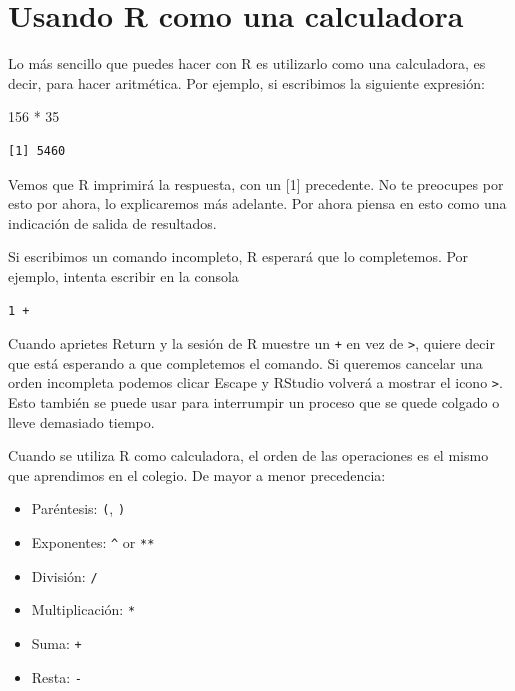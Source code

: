 \documentclass[
  letterpaper,
  DIV=11,
  numbers=noendperiod]{scrreprt}
\newenvironment{Shaded}{\begin{snugshade}}{\end{snugshade}}
\newcommand{\DecValTok}[1]{\textcolor[rgb]{0.68,0.00,0.00}{#1}}
\newcommand{\SpecialCharTok}[1]{\textcolor[rgb]{0.37,0.37,0.37}{#1}}
\providecommand{\tightlist}{%
  \setlength{\itemsep}{0pt}\setlength{\parskip}{0pt}}\usepackage{longtable,booktabs,array}
\begin{document}
\hypertarget{usando-r-como-una-calculadora}{%
\section{Usando R como una
calculadora}\label{usando-r-como-una-calculadora}}

Lo más sencillo que puedes hacer con R es utilizarlo como una
calculadora, es decir, para hacer aritmética. Por ejemplo, si escribimos
la siguiente expresión:

\begin{Shaded}
\begin{Highlighting}[]
\DecValTok{156} \SpecialCharTok{*} \DecValTok{35}
\end{Highlighting}
\end{Shaded}

\begin{verbatim}
[1] 5460
\end{verbatim}

Vemos que R imprimirá la respuesta, con un {[}1{]} precedente. No te
preocupes por esto por ahora, lo explicaremos más adelante. Por ahora
piensa en esto como una indicación de salida de resultados.

Si escribimos un comando incompleto, R esperará que lo completemos. Por
ejemplo, intenta escribir en la consola

\texttt{1\ +}

Cuando aprietes Return y la sesión de R muestre un \texttt{+} en vez de
\texttt{\textgreater{}}, quiere decir que está esperando a que
completemos el comando. Si queremos cancelar una orden incompleta
podemos clicar Escape y RStudio volverá a mostrar el icono
\texttt{\textgreater{}}. Esto también se puede usar para interrumpir un
proceso que se quede colgado o lleve demasiado tiempo.

Cuando se utiliza R como calculadora, el orden de las operaciones es el
mismo que aprendimos en el colegio. De mayor a menor precedencia:

\begin{itemize}
\tightlist
\item
  Paréntesis: \texttt{(}, \texttt{)}
\item
  Exponentes: \texttt{\^{}} or \texttt{**}
\item
  División: \texttt{/}
\item
  Multiplicación: \texttt{*}
\item
  Suma: \texttt{+}
\item
  Resta: \texttt{-}
\end{itemize}
\end{document}
